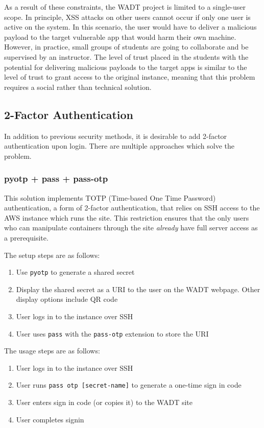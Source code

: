 \documentclass[12pt]{article}
\begin{document}
As a result of these constraints, the WADT project is limited to a single-user scope. In principle, XSS attacks on other users cannot occur if only one user is active on the system. In this scenario, the user would have to deliver a malicious payload to the target vulnerable app that would harm their own machine. However, in practice, small groups of students are going to collaborate and be supervised by an instructor. The level of trust placed in the students with the potential for delivering malicious payloads to the target apps is similar to the level of trust to grant access to the original instance, meaning that this problem requires a social rather than technical solution.

\subsection{2-Factor Authentication}
In addition to previous security methods, it is desirable to add 2-factor authentication upon login. There are multiple approaches which solve the problem.

\subsubsection{pyotp + pass + pass-otp}
This solution implements TOTP (Time-based One Time Password) authentication, a form of 2-factor authentication, that relies on SSH access to the AWS instance which runs the site. This restriction ensures that the only users who can manipulate containers through the site \textit{already} have full server access as a prerequisite.

The setup steps are as follows:
\begin{enumerate}
	\item Use \texttt{pyotp} to generate a shared secret
	\item Display the shared secret as a URI to the user on the WADT webpage. Other display options include QR code
	\item User logs in to the instance over SSH
	\item User uses \texttt{pass} with the \texttt{pass-otp} extension to store the URI
\end{enumerate}

The usage steps are as follows:
\begin{enumerate}
	\item User logs in to the instance over SSH
	\item User runs \texttt{pass otp [secret-name]} to generate a one-time sign in code
	\item User enters sign in code (or copies it) to the WADT site
	\item User completes signin
\end{enumerate}
\end{document}
